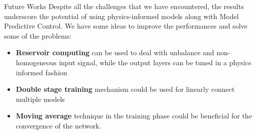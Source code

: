 \documentclass{beamer}
\begin{document}
\begin{frame}{Future Works}
    Despite all the challenges that we have encountered, the results underscore the potential of using physics-informed models along with Model Predictive Control. We have some ideas to improve the performances and solve some of the problems:
    \vspace{1em}
    \begin{itemize}
        \item \textbf{Reservoir computing} can be used to deal with unbalance and non-homogeneous input signal, while the output layers can be tuned in a physics informed fashion
        \item \textbf{Double stage training} mechanism could be used for linearly connect multiple models
        \item  \textbf{Moving average} technique in the training phase could be beneficial for the convergence of the network.
    \end{itemize}
\end{frame}
\backmatter
\end{document}
